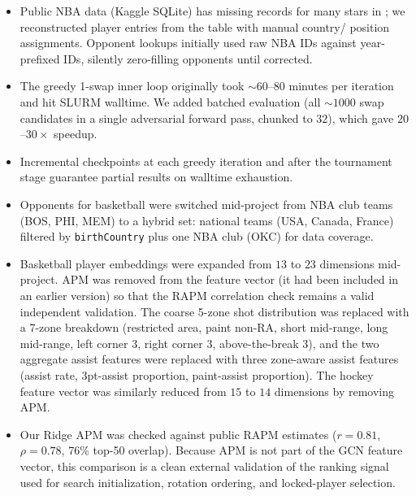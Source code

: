 \documentclass[11pt,letterpaper]{article}
\begin{document}
\begin{itemize}[leftmargin=*]
  \item Public NBA data (Kaggle SQLite) has missing records for many
    stars in ; we reconstructed player
    entries from the  table with manual country/
    position assignments. Opponent lookups initially used raw NBA IDs
    against year-prefixed IDs, silently zero-filling opponents until
    corrected.
  \item The greedy 1-swap inner loop originally took $\sim 60$--$80$
    minutes per iteration and hit SLURM walltime. We added
    batched evaluation (all $\sim 1000$ swap candidates in a single
    adversarial forward pass, chunked to $32$), which gave $20$--$30
    \times$ speedup.
  \item Incremental checkpoints at each greedy iteration and after the
    tournament stage guarantee partial results on walltime exhaustion.
  \item Opponents for basketball were switched mid-project from NBA
    club teams (BOS, PHI, MEM) to a hybrid set: national teams (USA,
    Canada, France) filtered by \texttt{birthCountry} plus one NBA
    club (OKC) for data coverage.
  \item Basketball player embeddings were expanded from $13$ to $23$
    dimensions mid-project. APM was removed from the feature vector
    (it had been included in an earlier version) so that the RAPM
    correlation check remains a valid independent validation. The
    coarse 5-zone shot distribution was replaced with a 7-zone
    breakdown (restricted area, paint non-RA, short mid-range, long
    mid-range, left corner 3, right corner 3, above-the-break 3), and
    the two aggregate assist features were replaced with three
    zone-aware assist features (assist rate, 3pt-assist proportion,
    paint-assist proportion). The hockey feature vector was similarly
    reduced from $15$ to $14$ dimensions by removing APM.
  \item Our Ridge APM was checked against public RAPM estimates
    ($r = 0.81$, $\rho = 0.78$, 76\% top-50 overlap). Because APM is
    not part of the GCN feature vector, this comparison is a clean
    external validation of the ranking signal used for search
    initialization, rotation ordering, and locked-player selection.
\end{itemize}
\end{document}
